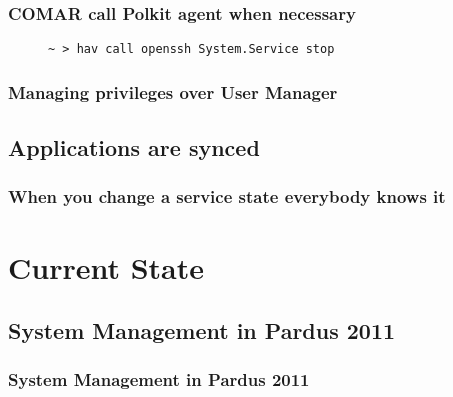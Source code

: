 \documentclass{beamer}
\begin{document}
\begin{frame}[fragile]
    \frametitle{COMAR call Polkit agent when necessary}
     \begin{figure}
      \begin{verbatim}~ > hav call openssh System.Service stop\end{verbatim}
     \begin{center}{}\end{center}
    \end{figure}
\end{frame}

\begin{frame}[fragile]
    \frametitle{Managing privileges over User Manager}
     \begin{figure}
     \begin{center}{}\end{center}
    \end{figure}
\end{frame}

\subsection{Applications are synced}

\begin{frame}[fragile]
    \frametitle{When you change a service state everybody knows it}
    \begin{figure}
     \begin{center}{}\end{center}
    \end{figure}
\end{frame}

\section{Current State}
\subsection{System Management in Pardus 2011}
\begin{frame}[fragile]
    \frametitle{System Management in Pardus 2011}
    \begin{figure}
     \begin{center}{}\end{center}
    \end{figure}
\end{frame}
\end{document}
